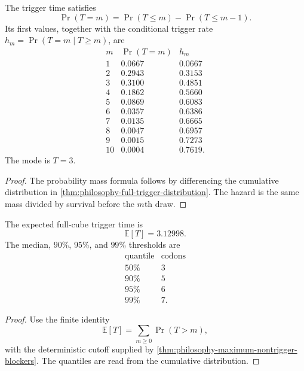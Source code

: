 
\begin{theorem}
\label{thm:philosophy-trigger-time-law}
The trigger time satisfies
$$
  \Pr(T=m)=\Pr(T\leq m)-\Pr(T\leq m-1).
$$
Its first values, together with the conditional trigger rate
$h_{m}=\Pr(T=m\mid T\geq m)$, are
$$
\begin{array}{c|r|r}
  m & \Pr(T=m) & h_{m}\\
  \hline
  1 & 0.0667 & 0.0667\\
  2 & 0.2943 & 0.3153\\
  3 & 0.3100 & 0.4851\\
  4 & 0.1862 & 0.5660\\
  5 & 0.0869 & 0.6083\\
  6 & 0.0357 & 0.6386\\
  7 & 0.0135 & 0.6665\\
  8 & 0.0047 & 0.6957\\
  9 & 0.0015 & 0.7273\\
  10 & 0.0004 & 0.7619.
\end{array}
$$
The mode is $T=3$.
\end{theorem}
\begin{proof}
The probability mass formula follows by differencing the cumulative
distribution in \autoref{thm:philosophy-full-trigger-distribution}. The
hazard is the same mass divided by survival before the $m$th draw.
\end{proof}

\begin{corollary}
\label{cor:philosophy-random-trigger-mean-quantiles}
The expected full-cube trigger time is
$$
  \mathbb{E}[T]=3.12998.
$$
The median, $90\%$, $95\%$, and $99\%$ thresholds are
$$
\begin{array}{c|r}
  \text{quantile} & \text{codons}\\
  \hline
  50\% & 3\\
  90\% & 5\\
  95\% & 6\\
  99\% & 7.
\end{array}
$$
\end{corollary}
\begin{proof}
Use the finite identity
$$
  \mathbb{E}[T]=\sum_{m\geq 0}\Pr(T>m),
$$
with the deterministic cutoff supplied by
\autoref{thm:philosophy-maximum-nontrigger-blockers}. The quantiles are
read from the cumulative distribution.
\end{proof}

